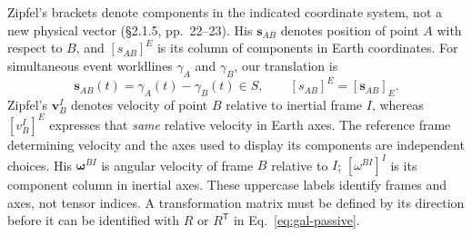 Zipfel's brackets denote components in the indicated coordinate system, not
a new physical vector (\S2.1.5, pp.~22--23).  His $\mathbf s_{AB}$ denotes
position of point $A$ with respect to $B$, and $[s_{AB}]^E$ is its column
of components in Earth coordinates.  For simultaneous event worldlines
$\gamma_A$ and $\gamma_B$, our translation is
\begin{equation}\label{eq:gal-zipfel-displacement}
 \mathbf s_{AB}(t)=\gamma_A(t)-\gamma_B(t)\in S,
 \qquad [s_{AB}]^E=[\mathbf s_{AB}]_E.
\end{equation}
Zipfel's $\mathbf v_B^I$ denotes velocity of point $B$ relative to inertial
frame $I$, whereas $[v_B^I]^E$ expresses that \emph{same} relative velocity
in Earth axes.  The reference frame determining velocity and the axes used
to display its components are independent choices.  His $\boldsymbol\omega^{BI}$
is angular velocity of frame $B$ relative to $I$; $[\omega^{BI}]^I$ is its
component column in inertial axes.  These uppercase labels identify frames
and axes, not tensor indices.  A transformation matrix must be defined by
its direction before it can be identified with $R$ or $R^{\mathsf T}$ in
Eq.~\eqref{eq:gal-passive}.
